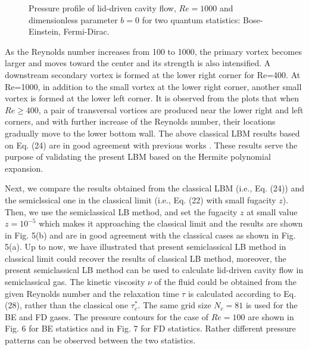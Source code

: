 \documentclass[doublecol]{epl2}
\begin{document}
\begin{figure}[ht]
	\centering
	\vfill
	\caption[A set of four subfigures.]{Pressure profile of lid-driven cavity flow, $Re=1000$ and dimensionless parameter $b=0$ for two quantum statistics:
	 Bose-Einstein,
	 Fermi-Dirac.}
	\label{fig:pressure_profile_b0}
\end{figure}

As the Reynolds number increases from 100 to 1000, the primary vortex becomes larger and moves toward the center and its strength is also intensified. A downstream secondary vortex is formed at the lower right corner for Re=400.  At Re=1000, in addition to the small vortex at the lower right corner, another small vortex is formed at the lower left corner. It is observed from the plots that when $Re \ge 400$, a pair of transversal vortices are produced near the lower right and left corners, and with further increase of the Reynolds number, their locations gradually move to the lower bottom wall. The above classical LBM results based on Eq. (24) are in good agreement with previous works \cite{Ku1987,Hou1995,Yang1998,Alben2005}. These results serve the purpose of validating the present LBM based on the Hermite polynomial expansion.

Next, we compare the results obtained from the classical LBM (i.e., Eq. (24)) and the semiclssical one in the classical limit (i.e., Eq. (22) with small fugacity $z$). Then, we use the semiclassical LB method, and set the fugacity $z$ at small value $z=10^{-5}$ which makes it approaching the classical limit and the results are shown in Fig. 5(b) and are in good agreement with the classical cases as shown in Fig. 5(a). Up to now, we have illustrated that present semiclassical LB method in classical limit could recover the results of classical LB method, moreover, the present semiclassical LB method can be used to calculate lid-driven cavity flow in semiclassical gas. The kinetic viscosity $\nu$ of the fluid could be obtained from the given Reynolds number and the relaxation time $\tau$ is calculated according to Eq. (28), rather than the classical one $\tau_c^*$. The same grid size $N_c=81$ is used for the BE and FD gases.  The pressure contours for the case of $Re=100$ are shown in Fig. 6 for BE statistics and in Fig. 7 for FD statistics. Rather different pressure patterns can be observed between the two statistics.
\end{document}
